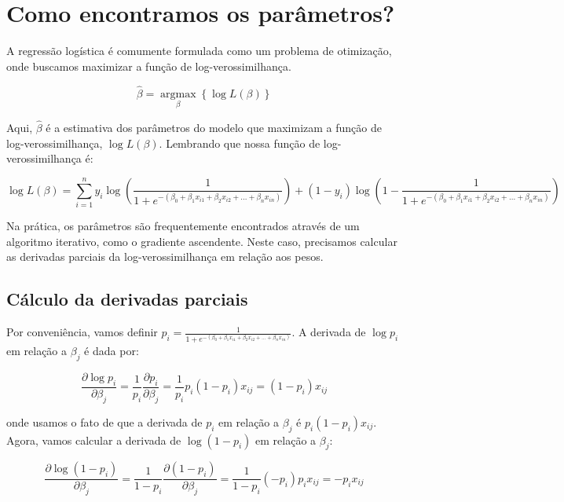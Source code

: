 \documentclass[12pt,a4paper, brazil]{article}
\begin{document}
\section{Como encontramos os parâmetros?}

A regressão logística é comumente formulada como um problema de otimização, onde buscamos maximizar a função de log-verossimilhança.

\begin{equation}
  \hat{\beta} = \underset{\beta}{\operatorname{argmax}} \left\{ \log L(\beta) \right\}
\end{equation}

Aqui, $\hat{\beta}$ é a estimativa dos parâmetros do modelo que maximizam a função de log-verossimilhança, $\log L(\beta)$. Lembrando que nossa função de log-verossimilhança é:

\begin{equation}
  \log L(\beta) = \sum_{i=1}^{n} y_i \log \left( \frac{1}{1+e^{-(\beta_0 + \beta_1x_{i1} + \beta_2x_{i2} + ... + \beta_nx_{in})}} \right) + (1-y_i) \log \left(1- \frac{1}{1+e^{-(\beta_0 + \beta_1x_{i1} + \beta_2x_{i2} + ... + \beta_nx_{in})}} \right)
\end{equation}

Na prática, os parâmetros são frequentemente encontrados através de um algoritmo iterativo, como o gradiente ascendente. Neste caso, precisamos calcular as derivadas parciais da log-verossimilhança em relação aos pesos. 

\subsection{Cálculo da derivadas parciais}

Por conveniência, vamos definir $p_i = \frac{1}{1+e^{-(\beta_0 + \beta_1x_{i1} + \beta_2x_{i2} + ... + \beta_nx_{in})}}$. A derivada de $\log p_i$ em relação a $\beta_j$ é dada por:

\begin{equation}
  \frac{\partial \log p_i}{\partial \beta_j} = \frac{1}{p_i} \frac{\partial p_i}{\partial \beta_j} = \frac{1}{p_i} p_i (1 - p_i) x_{ij} = (1 - p_i) x_{ij}
\end{equation}
 
\noindent onde usamos o fato de que a derivada de $p_i$ em relação a $\beta_j$ é $p_i (1 - p_i) x_{ij}$. Agora, vamos calcular a derivada de $\log (1 - p_i)$ em relação a $\beta_j$:

\begin{equation}
  \frac{\partial \log (1 - p_i)}{\partial \beta_j} = \frac{1}{1 - p_i} \frac{\partial (1 - p_i)}{\partial \beta_j} = \frac{1}{1 - p_i} (-p_i) p_i x_{ij} = - p_i x_{ij}
\end{equation}
\end{document}
